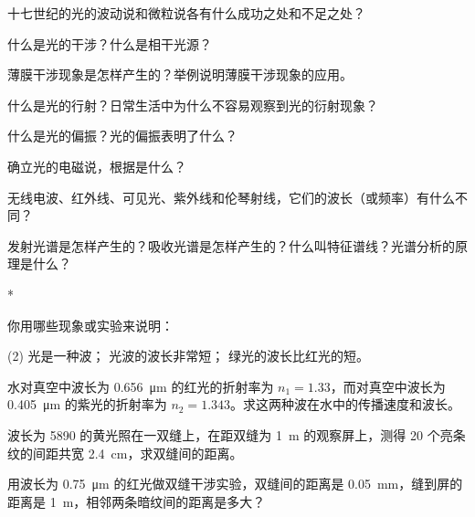 \begin{Review}
\begin{question}
  \item 十七世纪的光的波动说和微粒说各有什么成功之处和不足之处？
  \item 什么是光的干涉？什么是相干光源？
  \item 薄膜干涉现象是怎样产生的？举例说明薄膜干涉现象的应用。
  \item 什么是光的行射？日常生活中为什么不容易观察到光的衍射现象？
  \item 什么是光的偏振？光的偏振表明了什么？
  \item 确立光的电磁说，根据是什么？
  \item 无线电波、红外线、可见光、紫外线和伦琴射线，它们的波长（或频率）有什么不同？
  \item 发射光谱是怎样产生的？吸收光谱是怎样产生的？什么叫特征谱线？光谱分析的原理是什么？
\end{question}
\end{Review}

\begin{Exercise}*
\begin{question}
  \item 你用哪些现象或实验来说明：
  \begin{tasks}(2)
    \task 光是一种波；
    \task 光波的波长非常短；
    \task 绿光的波长比红光的短。
  \end{tasks}
  \item 水对真空中波长为 \qty{0.656}{\micro m} 的红光的折射率为 $n_1=1.33$，而对真空中波长为 \qty{0.405}{\micro m} 的紫光的折射率为 $n_2=1.343$。求这两种波在水中的传播速度和波长。
  \item 波长为 \qty{5890}{\text{\AA}} 的黄光照在一双缝上，在距双缝为 \qty{1}{m} 的观察屏上，测得 20 个亮条纹的间距共宽 \qty{2.4}{cm}，求双缝间的距离。
  \item 用波长为 \qty{0.75}{\micro m} 的红光做双缝干涉实验，双缝间的距离是 \qty{0.05}{mm}，缝到屏的距离是 \qty{1}{m}，相邻两条暗纹间的距离是多大？
\end{question}
\end{Exercise}